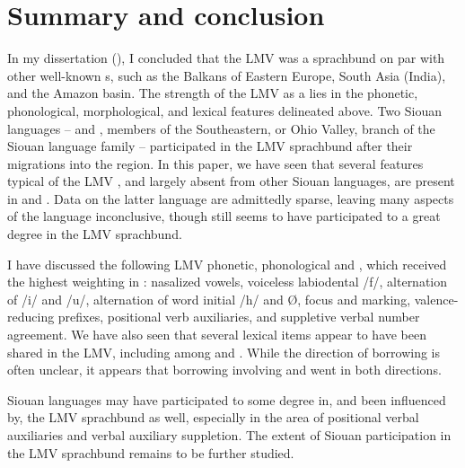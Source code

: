 \documentclass[output=paper]{LSP/langsci}
\begin{document}
\section{Summary and conclusion}
	
In my dissertation (\citealt[3]{Kaufman2014}), I concluded that the LMV was a sprachbund on par with other well-known s, such as the Balkans of Eastern Europe, South Asia (India), and the Amazon basin. The strength of the LMV as a  lies in the phonetic, phonological, morphological, and lexical features delineated above. Two Siouan languages --  and , members of the Southeastern, or Ohio Valley, branch of the Siouan language family -- participated in the LMV sprachbund after their migrations into the region. In this paper, we have seen that several features typical of the LMV , and largely absent from other Siouan languages, are present in  and . Data on the latter language are admittedly sparse, leaving many aspects of the language inconclusive, though  still seems to have participated to a great degree in the LMV sprachbund. 

I have discussed the following LMV phonetic, phonological and , which received the highest weighting in \citet{Kaufman2014}: nasalized vowels, voiceless labiodental  /f/, alternation of /i/ and /u/, alternation of word initial /h/ and Ø, focus and  marking, valence-reducing prefixes, positional verb auxiliaries, and suppletive verbal number agreement. We have also seen that several lexical items appear to have been shared in the LMV, including among  and . While the direction of borrowing is often unclear, it appears that borrowing involving  and  went in both directions.

 Siouan languages may have participated to some degree in, and been influenced by, the LMV sprachbund as well, especially in the area of positional verbal auxiliaries and verbal auxiliary suppletion. The extent of  Siouan participation in the LMV sprachbund remains to be further studied.
\end{document}
